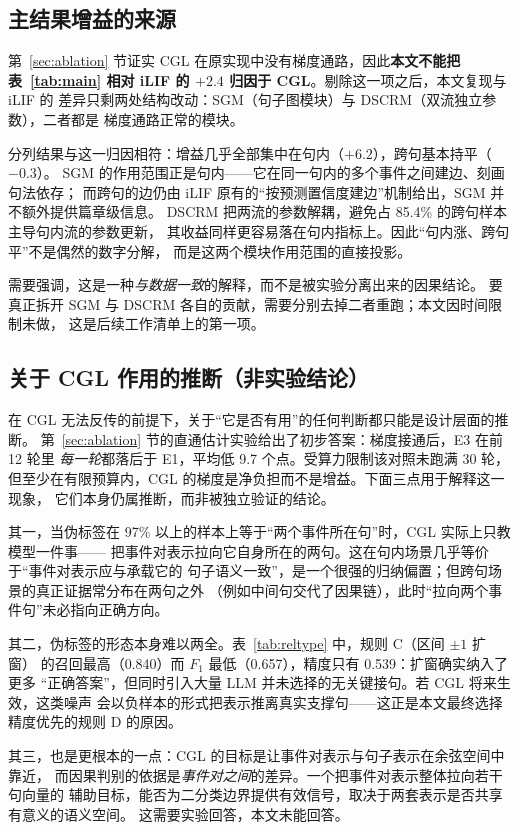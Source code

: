 \subsection{主结果增益的来源}

第~\ref{sec:ablation} 节证实 CGL 在原实现中没有梯度通路，因此\textbf{本文不能把
表~\ref{tab:main} 相对 iLIF 的 $+2.4$ 归因于 CGL}。剔除这一项之后，本文复现与 iLIF 的
差异只剩两处结构改动：SGM（句子图模块）与 DSCRM（双流独立参数），二者都是
梯度通路正常的模块。

分列结果与这一归因相符：增益几乎全部集中在句内（$+6.2$），跨句基本持平（$-0.3$）。
SGM 的作用范围正是句内——它在同一句内的多个事件之间建边、刻画句法依存；
而跨句的边仍由 iLIF 原有的“按预测置信度建边”机制给出，SGM 并不额外提供篇章级信息。
DSCRM 把两流的参数解耦，避免占 85.4\% 的跨句样本主导句内流的参数更新，
其收益同样更容易落在句内指标上。因此“句内涨、跨句平”不是偶然的数字分解，
而是这两个模块作用范围的直接投影。

需要强调，这是一种\emph{与数据一致}的解释，而不是被实验分离出来的因果结论。
要真正拆开 SGM 与 DSCRM 各自的贡献，需要分别去掉二者重跑；本文因时间限制未做，
这是后续工作清单上的第一项。

\subsection{关于 CGL 作用的推断（非实验结论）}

在 CGL 无法反传的前提下，关于“它是否有用”的任何判断都只能是设计层面的推断。
第~\ref{sec:ablation} 节的直通估计实验给出了初步答案：梯度接通后，E3 在前 12 轮里
\emph{每一轮}都落后于 E1，平均低 9.7 个点。受算力限制该对照未跑满 30 轮，
但至少在有限预算内，CGL 的梯度是净负担而不是增益。下面三点用于解释这一现象，
它们本身仍属推断，而非被独立验证的结论。

其一，当伪标签在 97\% 以上的样本上等于“两个事件所在句”时，CGL 实际上只教模型一件事——
把事件对表示拉向它自身所在的两句。这在句内场景几乎等价于“事件对表示应与承载它的
句子语义一致”，是一个很强的归纳偏置；但跨句场景的真正证据常分布在两句之外
（例如中间句交代了因果链），此时“拉向两个事件句”未必指向正确方向。

其二，伪标签的形态本身难以两全。表~\ref{tab:reltype} 中，规则 C（区间 $\pm1$ 扩窗）
的召回最高（0.840）而 $F_1$ 最低（0.657），精度只有 0.539：扩窗确实纳入了更多
“正确答案”，但同时引入大量 LLM 并未选择的无关键接句。若 CGL 将来生效，这类噪声
会以负样本的形式把表示推离真实支撑句——这正是本文最终选择精度优先的规则 D 的原因。

其三，也是更根本的一点：CGL 的目标是让事件对表示与句子表示在余弦空间中靠近，
而因果判别的依据是\emph{事件对之间}的差异。一个把事件对表示整体拉向若干句向量的
辅助目标，能否为二分类边界提供有效信号，取决于两套表示是否共享有意义的语义空间。
这需要实验回答，本文未能回答。

